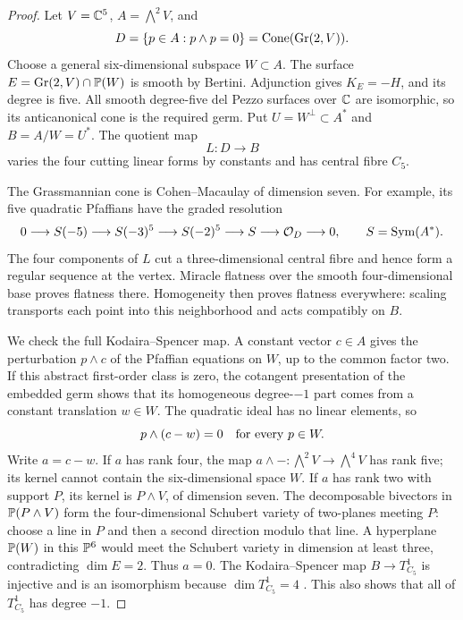 \begin{proof}
Let $V=\mathbb{C}^5$, $A=\bigwedge^2V$, and
\[
 D=\{p\in A:p\wedge p=0\}=\operatorname{Cone}(\operatorname{Gr}(2,V)).
\]
Choose a general six-dimensional subspace $W\subset A$.
The surface $E=\operatorname{Gr}(2,V)\cap\mathbb{P}(W)$ is smooth by
Bertini.  Adjunction gives $K_E=-H$, and its degree is five.
All smooth degree-five del Pezzo surfaces over $\mathbb{C}$ are isomorphic,
so its anticanonical cone is the required germ.  Put
$U=W^\perp\subset A^*$ and $B=A/W=U^*$.  The quotient map
\begin{equation}\label{eq03:degree5family}
 L:D\longrightarrow B
\end{equation}
varies the four cutting linear forms by constants and has central
fibre $C_5$.

The Grassmannian cone is Cohen--Macaulay of dimension seven.
For example, its five quadratic Pfaffians have the graded resolution
\[
 0\longrightarrow S(-5)\longrightarrow S(-3)^5
 \longrightarrow S(-2)^5\longrightarrow S
 \longrightarrow\mathcal{O}_D\longrightarrow0,
 \qquad S=\operatorname{Sym}(A^*).
\]
The four components of $L$ cut a three-dimensional central fibre
and hence form a regular sequence at the vertex.  Miracle flatness
over the smooth four-dimensional base proves flatness there.
Homogeneity then proves flatness everywhere: scaling transports
each point into this neighborhood and acts compatibly on $B$.

We check the full Kodaira--Spencer map.  A constant vector $c\in A$
gives the perturbation $p\wedge c$ of the Pfaffian equations on $W$,
up to the common factor two.  If this abstract first-order class is
zero, the cotangent presentation of the embedded germ shows that
its homogeneous degree-$-1$ part comes from a constant translation
$w\in W$.  The quadratic ideal has no linear elements, so
\[
 p\wedge(c-w)=0\quad\hbox{for every }p\in W.
\]
Write $a=c-w$.  If $a$ has rank four, the map
$a\wedge-:\bigwedge^2V\to\bigwedge^4V$ has rank five; its
kernel cannot contain the six-dimensional space $W$.
If $a$ has rank two with support $P$, its kernel is
$P\wedge V$, of dimension seven.  The decomposable bivectors in
$\mathbb{P}(P\wedge V)$ form the four-dimensional Schubert variety of
two-planes meeting $P$: choose a line in $P$ and then a second
direction modulo that line.  A hyperplane $\mathbb{P}(W)$ in this
$\mathbb{P}^6$ would meet the Schubert variety in dimension at least
three, contradicting $\dim E=2$.  Thus $a=0$.
The Kodaira--Spencer map $B\to T^1_{C_5}$ is injective and is
an isomorphism because $\dim T^1_{C_5}=4$
\cite[\S5.5]{Gross97rev}.  This also shows that all of $T^1_{C_5}$
has degree $-1$.


\end{proof}
